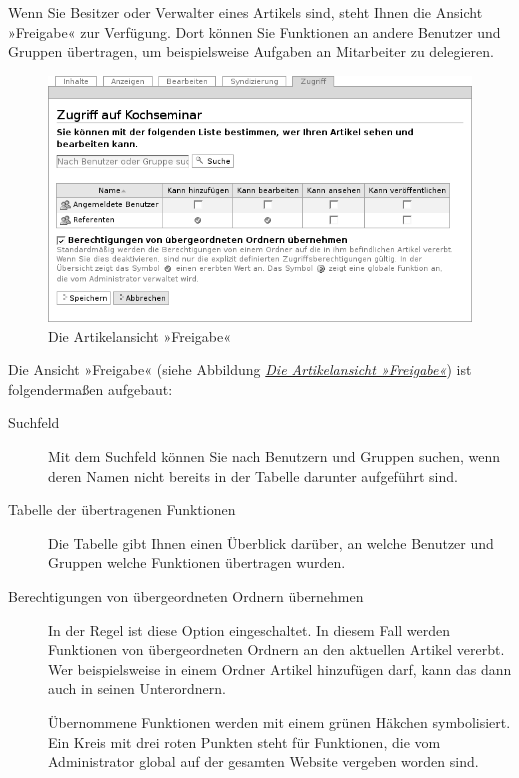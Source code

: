 \documentclass[a4paper,12pt,ngerman]{manual}
\begin{document}
Wenn Sie Besitzer oder Verwalter eines Artikels sind, steht Ihnen die
Ansicht »Freigabe« zur Verfügung. Dort können Sie Funktionen an andere
Benutzer und Gruppen übertragen, um beispielsweise Aufgaben an Mitarbeiter zu
delegieren.
\hypertarget{fig-freigabe}{}\begin{figure}[htbp]
\centering

\includegraphics{zugriff.png}
\caption{Die Artikelansicht »Freigabe«}\end{figure}

Die Ansicht »Freigabe« (siehe Abbildung \hyperlink{fig-freigabe}{\emph{Die Artikelansicht »Freigabe«}}) ist
folgendermaßen aufgebaut:
\begin{description}
\item[Suchfeld] \leavevmode
Mit dem Suchfeld können Sie nach Benutzern und Gruppen suchen,
wenn deren Namen nicht bereits in der Tabelle darunter aufgeführt sind.

\item[Tabelle der übertragenen Funktionen] \leavevmode
Die Tabelle gibt Ihnen einen
Überblick darüber, an welche Benutzer und Gruppen welche Funktionen
übertragen wurden.

\item[Berechtigungen von übergeordneten Ordnern übernehmen] \leavevmode
In der Regel ist diese Option eingeschaltet. In diesem Fall werden
Funktionen von übergeordneten Ordnern an den aktuellen Artikel
vererbt. Wer beispielsweise in einem Ordner Artikel hinzufügen darf,
kann das dann auch in seinen Unterordnern.

Übernommene Funktionen werden mit einem grünen Häkchen symbolisiert. Ein
Kreis mit drei roten Punkten steht für Funktionen, die vom Administrator
global auf der gesamten Website vergeben worden sind.

\end{description}
\end{document}
